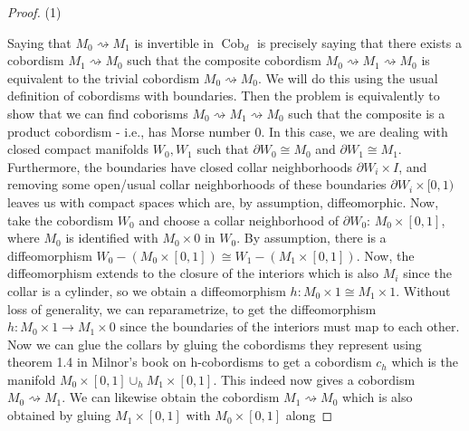 \documentclass[reqno]{amsart}
\theoremstyle{definition}
\theoremstyle{remark}
\DeclareMathOperator{\Cob}{Cob}
\begin{document}
    \begin{proof}
        (1)

         Saying that
        $M_0 \rightsquigarrow M_1$ is invertible
        in $\Cob_d$ is precisely saying that
        there exists a cobordism
        $M_1 \rightsquigarrow M_0$ such that the
        composite cobordism
        $M_0 \rightsquigarrow M_1\rightsquigarrow M_0$ 
        is equivalent to the trivial cobordism
        $M_0 \rightsquigarrow M_0$. We
        will do this using the usual definition
        of cobordisms with boundaries. Then
        the problem is equivalently to show that
        we can find coborisms
        $M_0 \rightsquigarrow M_1\rightsquigarrow M_0$ 
        such that
        the composite
        is a product cobordism - i.e., has Morse number
        $0$.
        In this case, we are dealing with closed
        compact manifolds
        $W_0, W_1$ such that
        $\partial W_0 \cong M_0$ and
        $\partial W_1 \cong M_1$. Furthermore,
        the boundaries have closed collar
        neighborhoods
        $\partial W_i \times I$, and removing some open/usual collar
        neighborhoods of these boundaries $\partial W_i \times 
        [0,1)$
        leaves us with compact spaces which are, by
        assumption, diffeomorphic.
        Now, take
        the cobordism $W_0$ and choose
        a collar neighborhood of $\partial W_0 $:
        $M_0 \times [0,1]$, where
        $M_0$ is identified with $M_0 \times 0$ in $W_0$.
        By assumption, there is a diffeomorphism
        $W_0 - \left( M_0 \times [0,1] \right) 
        \cong W_1 - \left( M_1 \times [0,1] \right) $.
        Now, the diffeomorphism
        extends to the closure of the interiors
        which is also $M_i$ since the collar is a cylinder, so
        we obtain a diffeomorphism
        $h \colon M_0 \times 1 \cong M_1 \times 1$. Without
        loss of generality, we can reparametrize, to get the
        diffeomorphism
        $h \colon M_0 \times 1 \to M_1 \times 0$ since
        the boundaries of the interiors must map to each other.
        Now we can glue the collars by gluing the cobordisms
        they represent using theorem 1.4 in Milnor's book
        on h-cobordisms to get a cobordism
        $c_h $ which is the manifold
        $M_0 \times [0,1] \cup_h M_1 \times [0,1]$.
        This indeed now gives a cobordism
        $M_0 \rightsquigarrow M_1$. We can likewise
        obtain the cobordism
        $M_1  \rightsquigarrow M_0 $ which is also obtained
        by gluing
        $M_1 \times [0,1]$ with $M_0\times  [0,1]$ along

\end{proof}
\end{document}
